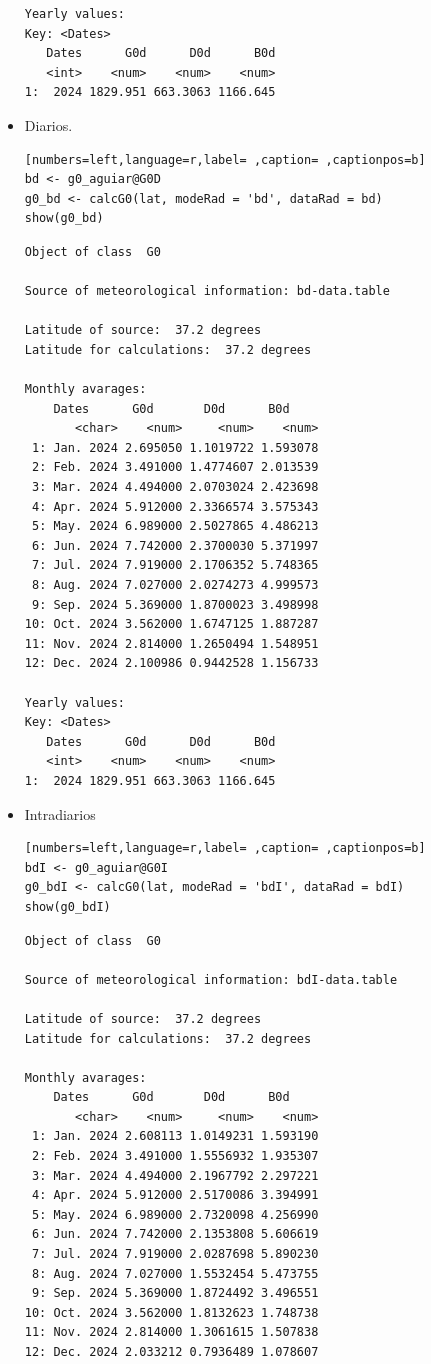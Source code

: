\begin{itemize}
\begin{verbatim}
Yearly values:
Key: <Dates>
   Dates      G0d      D0d      B0d
   <int>    <num>    <num>    <num>
1:  2024 1829.951 663.3063 1166.645
\end{verbatim}

\item Diarios.
\begin{lstlisting}[numbers=left,language=r,label= ,caption= ,captionpos=b]
bd <- g0_aguiar@G0D
g0_bd <- calcG0(lat, modeRad = 'bd', dataRad = bd)
show(g0_bd)
\end{lstlisting}

\begin{verbatim}
Object of class  G0 

Source of meteorological information: bd-data.table 

Latitude of source:  37.2 degrees
Latitude for calculations:  37.2 degrees

Monthly avarages:
	Dates      G0d       D0d      B0d
       <char>    <num>     <num>    <num>
 1: Jan. 2024 2.695050 1.1019722 1.593078
 2: Feb. 2024 3.491000 1.4774607 2.013539
 3: Mar. 2024 4.494000 2.0703024 2.423698
 4: Apr. 2024 5.912000 2.3366574 3.575343
 5: May. 2024 6.989000 2.5027865 4.486213
 6: Jun. 2024 7.742000 2.3700030 5.371997
 7: Jul. 2024 7.919000 2.1706352 5.748365
 8: Aug. 2024 7.027000 2.0274273 4.999573
 9: Sep. 2024 5.369000 1.8700023 3.498998
10: Oct. 2024 3.562000 1.6747125 1.887287
11: Nov. 2024 2.814000 1.2650494 1.548951
12: Dec. 2024 2.100986 0.9442528 1.156733

Yearly values:
Key: <Dates>
   Dates      G0d      D0d      B0d
   <int>    <num>    <num>    <num>
1:  2024 1829.951 663.3063 1166.645
\end{verbatim}

\item Intradiarios
\begin{lstlisting}[numbers=left,language=r,label= ,caption= ,captionpos=b]
bdI <- g0_aguiar@G0I
g0_bdI <- calcG0(lat, modeRad = 'bdI', dataRad = bdI)
show(g0_bdI)
\end{lstlisting}

\begin{verbatim}
Object of class  G0 

Source of meteorological information: bdI-data.table 

Latitude of source:  37.2 degrees
Latitude for calculations:  37.2 degrees

Monthly avarages:
	Dates      G0d       D0d      B0d
       <char>    <num>     <num>    <num>
 1: Jan. 2024 2.608113 1.0149231 1.593190
 2: Feb. 2024 3.491000 1.5556932 1.935307
 3: Mar. 2024 4.494000 2.1967792 2.297221
 4: Apr. 2024 5.912000 2.5170086 3.394991
 5: May. 2024 6.989000 2.7320098 4.256990
 6: Jun. 2024 7.742000 2.1353808 5.606619
 7: Jul. 2024 7.919000 2.0287698 5.890230
 8: Aug. 2024 7.027000 1.5532454 5.473755
 9: Sep. 2024 5.369000 1.8724492 3.496551
10: Oct. 2024 3.562000 1.8132623 1.748738
11: Nov. 2024 2.814000 1.3061615 1.507838
12: Dec. 2024 2.033212 0.7936489 1.078607


\end{verbatim}
\end{itemize}
